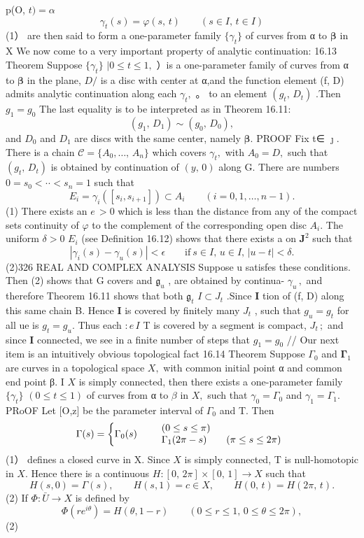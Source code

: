p(O, $t)=\alpha$ $$ \gamma_{t}(s)=\varphi(s,\,t)\qquad(s\in I,\,t\in I) $$ (1） are then said to form a one-parameter family $\{\gamma_{t}\}$ of curves from α to $\boldsymbol{\beta}$ in X We now come to a very important property of analytic continuation: 16.13 Theorem Suppose $\{\gamma_{t}\}$ $|0\leq t\leq1,$ ）is a one-parameter family of curves from α to $\boldsymbol{\beta}$ in the plane, $D\!\!\!\!/$ is a disc with center at α,and the function element (f, D) admits analytic continuation along each $\gamma_{t},$ 。 to an element $(g_{t},\,D_{t})$ .Then $g_{1}=g_{0}$ The last equality is to be interpreted as in Theorem 16.11: $$ (g_{1},\,D_{1})\sim(g_{0},\,D_{0}), $$ and $D_{0}$ and $D_{1}$ are discs with the same center, namely ${\boldsymbol{\beta}}.$ PROOF Fix t∈ ${\boldsymbol{\jmath}}.$ There is a chain ${\mathcal{C}}=\{A_{0},\ldots,\,A_{n}\}$ which covers $\gamma_{t},$ with $A_{0}=D,$ such that $(g_{t},\,D_{t})$ is obtained by continuation of $\scriptstyle(y,\,0)$ along G. There are numbers $0=s_{0}<\cdot\cdot<s_{n}=1$ such that $$ E_{i}=\gamma_{i}([s_{i},s_{i+1}])\subset A_{i}\qquad(i=0,1,\ldots,n-1). $$ (1) There exists an $\scriptstyle e\,>0$ which is less than the distance from any of the compact sets continuity of $\varphi$ to the complement of the corresponding open disc $A_{i}.$ The uniform $\delta>0$ $\textstyle E_{i}$ (see Definition 16.12) shows that there exists a on ${\boldsymbol{J}}^{2}$ such that $$ |\gamma_{i}(s)-\gamma_{u}(s)|<\epsilon\qquad\mathrm{if~}s\in I,\,u\in I,\,|u-t|<\delta. $$ (2)326 REAL AND COMPLEX ANALYSIS Suppose u satisfes these conditions. Then (2) shows that G covers and ${\mathfrak{g}}_{u}$ , are obtained by continua- $\gamma_{u}\,,$ and therefore Theorem 16.11 shows that both ${\mathfrak{g}}_{t}$ $I\subset J_{t}$ .Since ${\mathbf I}$ tion of (f, D) along this same chain B. Hence ${\mathbf I}$ is covered by finitely many ${\mathbf{}}J_{t}$ , such that $g_{u}=g_{t}$ for all ue is $g_{t}=g_{u}.$ Thus each $\scriptstyle{:e\,I}$ T is covered by a segment is compact, ${\mathit{J_{t}}}\,;$ and since ${\mathbf I}$ connected, we see in a finite number of steps that $g_{1}=g_{0}$ // Our next item is an intuitively obvious topological fact 16.14 Theorem Suppose ${\Gamma}_{\mathrm{0}}$ and ${\boldsymbol{\Gamma}}_{1}$ are curves in a topological space $X,$ with common initial point α and common end point β. I $\textstyle X$ is simply connected, then there exists a one-parameter family $\{\gamma_{t}\}$ $(0\leq t\leq1)$ of curves from α to $\beta$ in $X,$ such that $\gamma_{0}=\Gamma_{0}$ and $\gamma_{1}=\Gamma_{1}.$ PRoOF Let [O,z] be the parameter interval of ${\Gamma}_{\mathrm{0}}$ and T. Then $$ \Gamma(s)=\left\{\Gamma_{0}(s)\qquad\begin{array}{l l}{{(0\leq s\leq\pi)}}\\ {{\Gamma_{1}(2\pi-s)\qquad(\pi\leq s\leq2\pi)}}\end{array}\right. $$ (1） defines a closed curve in X. Since $\textstyle X$ is simply connected, T is null-homotopic in $X.$ Hence there is a continuous $H\colon[0,\,2\pi]\times[0,\,1]\to X$ such that $$ H(s,0)=\Gamma(s),\qquad H(s,1)=c\in X,\qquad H(0,\,t)=H(2\pi,\,t). $$ (2) If $\Phi\colon{\bar{U}}\to X$ is defined by $$ \Phi(r e^{i\theta})=H(\theta,1-r)\qquad(0\leq r\leq1,\,0\leq\theta\leq2\pi), $$ (2) 